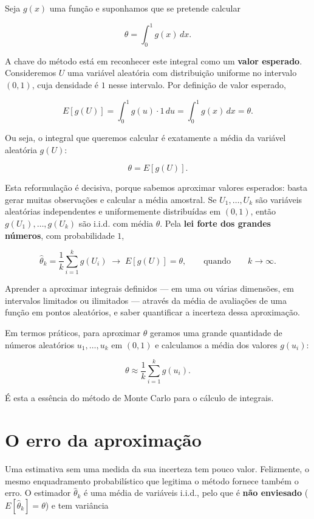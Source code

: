 \documentclass[
  portuguese,
  11pt,
  openany]{book}
\begin{document}
Seja \(g(x)\) uma função e suponhamos que se pretende calcular

\[
\theta = \int_{0}^{1} g(x)\, dx.
\]

A chave do método está em reconhecer este integral como um \textbf{valor esperado}.
Consideremos \(U\) uma variável aleatória com distribuição uniforme no intervalo
\((0,1)\), cuja densidade é \(1\) nesse intervalo. Por definição de valor esperado,

\[
E[g(U)] = \int_{0}^{1} g(u) \cdot 1 \, du = \int_{0}^{1} g(x)\, dx = \theta.
\]

Ou seja, o integral que queremos calcular é exatamente a média da variável
aleatória \(g(U)\):

\[
\theta = E[g(U)].
\]

Esta reformulação é decisiva, porque sabemos aproximar valores esperados: basta
gerar muitas observações e calcular a média amostral. Se \(U_1, \ldots, U_k\) são
variáveis aleatórias independentes e uniformemente distribuídas em \((0,1)\),
então \(g(U_1), \ldots, g(U_k)\) são i.i.d. com média \(\theta\). Pela \textbf{lei forte
dos grandes números}, com probabilidade \(1\),

\[
\hat{\theta}_k = \frac{1}{k}\sum_{i=1}^{k} g(U_i)
\;\longrightarrow\; E[g(U)] = \theta,
\qquad \text{quando} \qquad k \to \infty.
\]

Aprender a aproximar integrais definidos --- em uma ou várias dimensões, em
intervalos limitados ou ilimitados --- através da média de avaliações de uma
função em pontos aleatórios, e saber quantificar a incerteza dessa aproximação.

Em termos práticos, para aproximar \(\theta\) geramos uma grande quantidade de
números aleatórios \(u_1, \ldots, u_k\) em \((0,1)\) e calculamos a média dos
valores \(g(u_i)\):

\[
\theta \approx \frac{1}{k}\sum_{i=1}^{k} g(u_i).
\]

É esta a essência do método de Monte Carlo para o cálculo de integrais.

\section{O erro da aproximação}\label{o-erro-da-aproximauxe7uxe3o}

Uma estimativa sem uma medida da sua incerteza tem pouco valor. Felizmente, o
mesmo enquadramento probabilístico que legitima o método fornece também o erro.
O estimador \(\hat{\theta}_k\) é uma média de variáveis i.i.d., pelo que é
\textbf{não enviesado} (\(E[\hat{\theta}_k] = \theta\)) e tem variância
\end{document}
